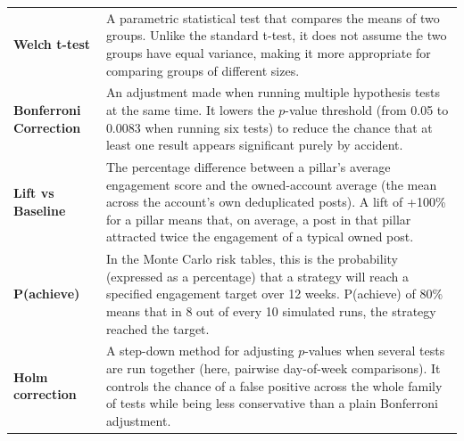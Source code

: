 \begin{longtable}{@{}L{4cm} L{11.5cm}@{}}
\textbf{Welch t-test} &
A parametric statistical test that compares the means of two groups. Unlike the
standard t-test, it does not assume the two groups have equal variance, making it
more appropriate for comparing groups of different sizes. \\[4pt]

\textbf{Bonferroni Correction} &
An adjustment made when running multiple hypothesis tests at the same time. It
lowers the $p$-value threshold (from 0.05 to 0.0083 when running six tests) to
reduce the chance that at least one result appears significant purely by accident. \\[4pt]

\textbf{Lift vs Baseline} &
The percentage difference between a pillar's average engagement score and the
owned-account average (the mean across the account's own deduplicated posts). A
lift of +100\% for a pillar means that, on average, a post in that pillar
attracted twice the engagement of a typical owned post. \\[4pt]

\textbf{P(achieve)} &
In the Monte Carlo risk tables, this is the probability (expressed as a
percentage) that a strategy will reach a specified engagement target over 12 weeks.
P(achieve) of 80\% means that in 8 out of every 10 simulated runs, the strategy
reached the target. \\[4pt]

\textbf{Holm correction} &
A step-down method for adjusting $p$-values when several tests are run together
(here, pairwise day-of-week comparisons). It controls the chance of a false
positive across the whole family of tests while being less conservative than a
plain Bonferroni adjustment. \\[4pt]

\end{longtable}

